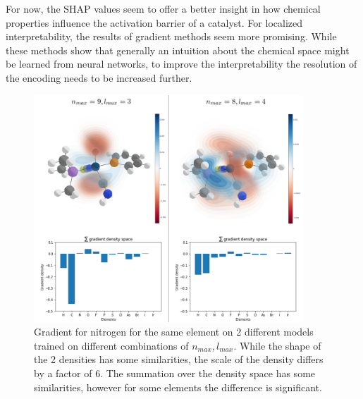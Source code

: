 For now, the SHAP values seem to offer a better insight in how chemical properties influence the activation barrier of a catalyst.
For localized interpretability, the results of gradient methods seem more promising.
While these methods show that generally an intuition about the chemical space might be learned from neural networks,
to improve the interpretability the resolution of the encoding needs to be increased further.
\begin{figure}[hb]
  \centering
  \includegraphics[width=0.9\textwidth]{figures/evaluation/Gradient-model-comp.png}
  \caption[Comparison of gradients between different models]{
      Gradient for nitrogen for the same element on 2 different models trained on different combinations of $n_{max}, l_{max}$.
      While the shape of the 2 densities has some similarities, the scale of the density differs by a factor of 6.
      The summation over the density space has some similarities, however for some elements the difference is significant.
   }
  \label{fig:snap-gradient-model}
\end{figure}